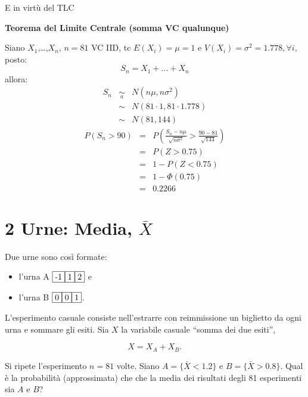 \documentclass[
  11pt,
]{book}
\providecommand{\tightlist}{%
  \setlength{\itemsep}{0pt}\setlength{\parskip}{0pt}}
\theoremstyle{mytheoremstyle}
\theoremstyle{mydefstyle}
\newenvironment{sol}
  {
  \begin{tcolorbox}[enhanced,breakable,arc=0.1mm,boxrule=1pt,colback=white,colframe=iblue,
  title=\bf \fontfamily{lmss}\selectfont \hspace{.5 cm} Soluzione,drop fuzzy shadow]

}{
\end{tcolorbox}
  }
\begin{document}
\begin{sol}
E in virtù del TLC

\textbf{Teorema del Limite Centrale (somma VC qualunque)}

Siano \(X_1\),\ldots,\(X_n\), \(n=81\) VC IID, tc \(E(X_i)=\mu=1\) e \(V(X_i)=\sigma^2=1.778,\forall i\), posto:
\[
      S_n = X_1 + ... + X_n
      \]
allora:\begin{eqnarray*}
  S_n & \mathop{\sim}\limits_{a}& N(n\mu,n\sigma^2) \\
     &\sim & N(81\cdot1,81\cdot1.778) \\
     &\sim & N(81,144) 
  \end{eqnarray*}\begin{eqnarray*}
      P( S_n   >   90 ) 
        &=& P\left(  \frac { S_n  -  n\mu }{ \sqrt{n\sigma^2} }  >  \frac { 90  -  81 }{\sqrt{ 144 }} \right)  \\
                 &=& P\left(  Z   >   0.75 \right) \\    &=& 1-P(Z< 0.75 )\\ 
                 &=&  1-\Phi( 0.75 ) \\ &=&  0.2266 
      \end{eqnarray*}

\end{sol}

\section{\texorpdfstring{2 Urne: Media, \(\bar{X}\)}{2 Urne: Media, \textbackslash bar\{X\}}}\label{urne-media-barx}

Due urne sono così formate:

\begin{itemize}
\tightlist
\item
  l'urna A \({\fbox{-1} \fbox{1} \fbox{2}}\) e\\
\item
  l'urna B \({\fbox{0} \fbox{0} \fbox{1}}\).
\end{itemize}

L'esperimento casuale consiste nell'estrarre con reimmissione un
biglietto da ogni urna e sommare gli esiti. Sia \(X\) la variabile casuale
``somma dei due esiti'',

\[X=X_{A} + X_{B}.\]

Si ripete l'esperimento \(n=81\) volte. Siano \(A=\{ \bar{X} < 1.2\}\) e
\(B=\{ \bar{X} > 0.8 \}\). Qual è la probabilità (approssimata) che che la
media dei risultati degli 81 esperimenti sia \(A\) e \(B\)?
\end{document}
